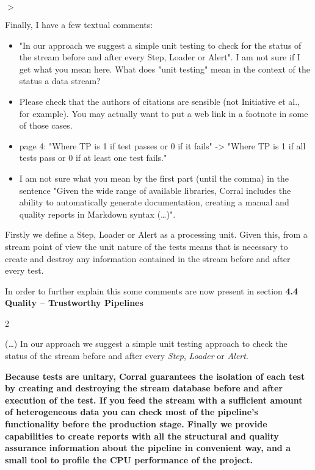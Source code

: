\documentclass[a4paper,onecolumn,fleqn,usenatbib,useAMS]{mnrasr}
\newenvironment{frshaded}{%
\def\FrameCommand{\fboxrule=\FrameRule\fboxsep=\FrameSep \fcolorbox{framecolor}{shadecolor}}%
\MakeFramed {\FrameRestore}}%
{\endMakeFramed}
\newenvironment{myindentpar}[1]%
 {\begin{list}{}%
         \bigskip
         \color{refereecolor}
         {\setlength{\leftmargin}{#1}}%
         \itshape
         \item[$>$]%
 }
 {\end{list}}
\begin{document}
\begin{myindentpar}{1cm}
Finally, I have a few textual comments: 

\begin{itemize}
 \item "In  our approach we suggest
  a simple unit testing to check for the status of the stream before and
  after every Step, Loader or Alert". I am not sure if I get what you
  mean here. What does "unit testing" mean in the context of the status
  a data stream?  
 \item Please check that the authors of citations are
  sensible (not Initiative et al., for example). You may actually want
  to put a web link in a footnote in some of those cases.  
 \item page 4: "Where TP is 1 if test passes or 0 if it fails" -> "Where TP is 1 if
  all tests pass or 0 if at least one test fails." 
\item I am not sure what you mean by the first part (until the comma) in the sentence "Given
  the wide range of available libraries, Corral includes the ability to
  automatically generate documentation, creating a manual and quality
  reports in Markdown syntax (\ldots)". 
\end{itemize}

\end{myindentpar}

%
Firstly we define a Step, Loader or Alert as a processing unit. 
%
Given this, from a stream point of view the unit nature of the tests means that is necessary
to create and destroy any information contained in the stream before and after every test.
%

In order to further explain this some comments are now present in section
\textbf{4.4 Quality -- Trustworthy Pipelines}
 
\begin{frshaded}
\begin{multicols}{2} 
   
(\ldots)
%
In our approach we suggest a simple unit testing approach to 
check the status of the stream before and after every
\textit{Step}, \textit{Loader} or \textit{Alert}.

\bfseries
Because tests are unitary, Corral guarantees the isolation of each
test by creating and destroying the stream database before 
and after execution of the test.
%
\mdseries
If you feed the stream with a sufficient amount of heterogeneous 
data you can check most of the pipeline's functionality before the 
production stage. Finally we provide capabilities to create reports
with all the structural and quality assurance information about 
the pipeline in convenient way, and a small tool to profile
the CPU performance of the project.
\end{multicols} \end{frshaded} 
\end{document}

